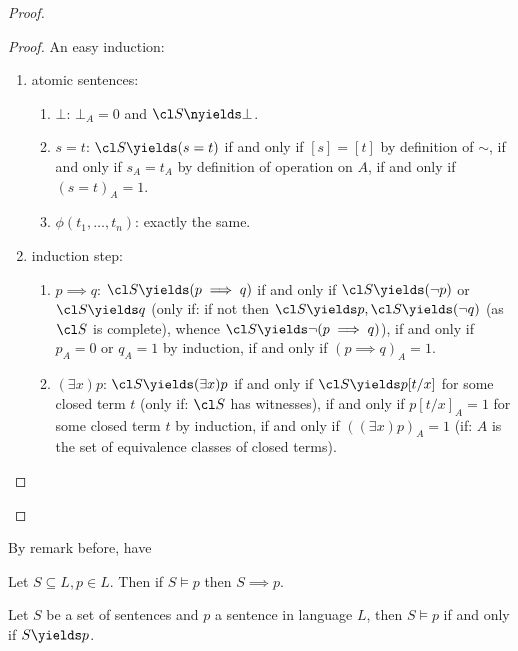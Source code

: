 \documentclass[a4paper]{article}
\begin{document}
\begin{proof}
  \begin{proof}
    An easy induction:
    \begin{enumerate}
    \item atomic sentences:
      \begin{enumerate}
      \item \(\bot\): \(\bot_A = 0\) and \(\cl S \nyields \bot\).
      \item \(s = t\): \(\cl S \yields (s = t)\) if and only if \([s] = [t]\) by definition of \(\sim\), if and only if \(s_A = t_A\) by definition of operation on \(A\), if and only if \((s = t)_A = 1\).
      \item \(\phi(t_1, \dots, t_n)\): exactly the same.
      \end{enumerate}
    \item induction step:
      \begin{enumerate}
      \item \(p \implies q\): \(\cl S \yields (p \implies q)\) if and only if \(\cl S \yields (\neg p)\) or \(\cl S \yields q\) (only if: if not then \(\cl S \yields p, \cl S \yields (\neg q)\) (as \(\cl S\) is complete), whence \(\cl S \yields \neg(p \implies q)\)), if and only if \(p_A = 0\) or \(q_A = 1\) by induction, if and only if \((p \implies q)_A = 1\).
      \item \((\exists x) p\): \(\cl S \yields (\exists x) p\) if and only if \(\cl S \yields p[t/x]\) for some closed term \(t\) (only if: \(\cl S\) has witnesses), if and only if \(p[t/x]_A = 1\) for some closed term \(t\) by induction, if and only if \(((\exists x) p)_A = 1\) (if: \(A\) is the set of equivalence classes of closed terms).
      \end{enumerate}
    \end{enumerate}
  \end{proof}
\end{proof}

By remark before, have

\begin{corollary}[Adequacy]
  Let \(S \subseteq L, p \in L\). Then if \(S \models p\) then \(S \implies p\).
\end{corollary}

\begin{theorem}
  \label{thm:Gödel completeness theorem}
  Let \(S\) be a set of sentences and \(p\) a sentence in language \(L\), then \(S \models p\) if and only if \(S \yields p\).
\end{theorem}
\end{document}
